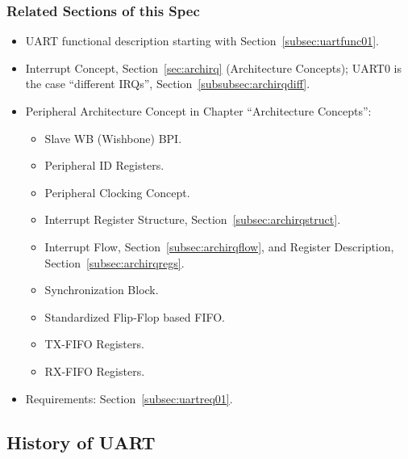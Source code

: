 \subsubsection{Related Sections of this Spec}
\begin{itemize}
  \item UART functional description starting with Section~\ref{subsec:uartfunc01}.
  \item Interrupt Concept, Section~\ref{sec:archirq} (Architecture Concepts); UART0 is the case ``different IRQs'', Section~\ref{subsubsec:archirqdiff}.
  \item Peripheral Architecture Concept in Chapter ``Architecture Concepts'':
  \begin{itemize}
    \item Slave WB (Wishbone) BPI.
    \item Peripheral ID Registers.
    \item Peripheral Clocking Concept.
    \item Interrupt Register Structure, Section~\ref{subsec:archirqstruct}.
    \item Interrupt Flow, Section~\ref{subsec:archirqflow}, and Register Description, Section~\ref{subsec:archirqregs}.
    \item Synchronization Block.
    \item Standardized Flip-Flop based FIFO.
    \item TX-FIFO Registers.
    \item RX-FIFO Registers.
  \end{itemize}
  \item Requirements: Section~\ref{subsec:uartreq01}.
\end{itemize}

\subsection{History of UART}

